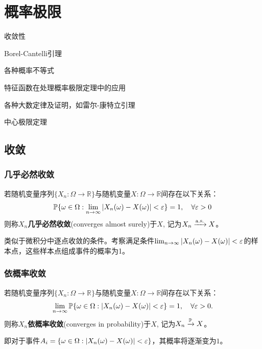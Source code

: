 \chapter{概率极限}\label{chap:limitation}
\begin{introduction}[考试重点]
    \item 收敛性
    \item Borel-Cantelli引理
    \item 各种概率不等式
    \item 特征函数在处理概率极限定理中的应用
    \item 各种大数定律及证明，如雷尔-康特立引理
    \item 中心极限定理
\end{introduction}
\section{收敛}

\subsection{几乎必然收敛}

\begin{definition}[几乎必然收敛]
    若随机变量序列$\{ X_n: \Omega \to \mathbb{R} \}$与随机变量$X:\Omega \to \mathbb{R}$间存在以下关系：
    \[ \P\{ \omega \in \Omega: \lim_{n \to \infty}\abs{ X_n(\omega) - X(\omega)} < \e \} =1,\quad \forall \e > 0\]
    则称$X_n$\textbf{几乎必然收敛}(converges almost surely)于$X$, 记为$X_n \xrightarrow{\as} X$。
\end{definition}
\begin{remark}
    类似于微积分中逐点收敛的条件。考察满足条件$\lim_{n \to \infty}\abs{ X_n(\omega) - X(\omega)} < \e$的样本点，这些样本点组成事件的概率为1。
\end{remark}

\subsection{依概率收敛}

\begin{definition}[依概率收敛]
    若随机变量序列$\{ X_n: \Omega \to \mathbb{R} \}$与随机变量$X:\Omega \to \mathbb{R}$间存在以下关系：
    \[ \lim_{n\to\infty}\P\{\omega \in \Omega: \abs{X_n(\omega) - X(\omega)}<\e\} = 1, \quad \forall \e>0. \]
    则称$X_n$\textbf{依概率收敛}(converges in probability)于$X$, 记为$X_n \xrightarrow{\P} X$。
\end{definition}
\begin{remark}
    即对于事件$A_i=\{\omega \in \Omega: \abs{X_n(\omega) - X(\omega)}<\e\}$，其概率将逐渐变为$1$。
\end{remark}

